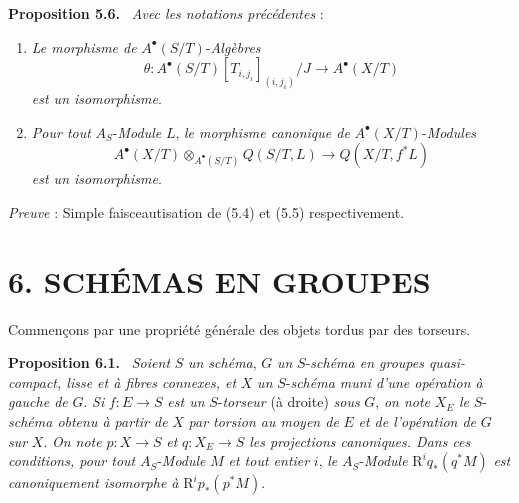 \documentclass[11pt]{article}
\newenvironment{statement}[1]{\par\medskip\noindent\textbf{#1.}\ }{\par\medskip}
\begin{document}
\begin{statement}{Proposition 5.6}
\emph{Avec les notations précédentes} :
\begin{enumerate}[label=\alph*)]
\item \emph{Le morphisme de} $A^\bullet(S/T)$-\emph{Algèbres}
\[
\theta:A^\bullet(S/T)[T_{i,j_i}]_{(i,j_i)}/J\to A^\bullet(X/T)
\]
\emph{est un isomorphisme}.
\item \emph{Pour tout} $A_S$-\emph{Module} $L$, \emph{le morphisme canonique de} $A^\bullet(X/T)$-\emph{Modules}
\[
A^\bullet(X/T)\otimes_{A^\bullet(S/T)}Q(S/T,L)\to Q(X/T,f^*L)
\]
\emph{est un isomorphisme}.
\end{enumerate}
\end{statement}

\emph{Preuve} : Simple faisceautisation de (5.4) et (5.5) respectivement.

\section*{6. SCHÉMAS EN GROUPES}

Commençons par une propriété générale des objets tordus par des torseurs.

\begin{statement}{Proposition 6.1}
\emph{Soient} $S$ \emph{un schéma}, $G$ \emph{un} $S$-\emph{schéma en groupes quasi-compact, lisse et à fibres connexes, et} $X$ \emph{un} $S$-\emph{schéma muni d'une opération à gauche de} $G$. \emph{Si} $f:E\to S$ \emph{est un} $S$-\emph{torseur} (à droite) \emph{sous} $G$, \emph{on note} $X_E$ \emph{le} $S$-\emph{schéma obtenu à partir de} $X$ \emph{par torsion au moyen de} $E$ \emph{et de l'opération de} $G$ \emph{sur} $X$. \emph{On note} $p:X\to S$ \emph{et} $q:X_E\to S$ \emph{les projections canoniques. Dans ces conditions, pour tout} $A_S$-\emph{Module} $M$ \emph{et tout entier} $i$, \emph{le} $A_S$-\emph{Module} $\mathrm{R}^iq_*(q^*M)$ \emph{est canoniquement isomorphe à} $\mathrm{R}^ip_*(p^*M)$.
\end{statement}
\end{document}
